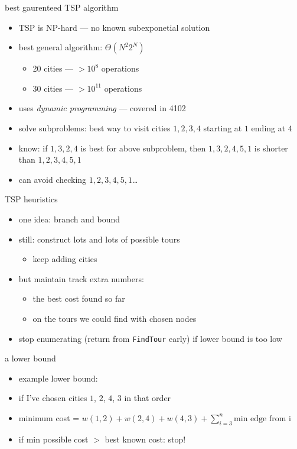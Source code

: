 \begin{frame}{best gaurenteed TSP algorithm}
\begin{itemize}
\item TSP is NP-hard --- no known subexponetial solution
\item best general algorithm: $\Theta(N^2 2^N)$
    \begin{itemize}
    \item 20 cities --- $>10^8$ operations
    \item 30 cities --- $>10^{11}$ operations
    \end{itemize}
\item uses \textit{dynamic programming} --- covered in 4102
\vspace{.5cm}
\item<2-> solve subproblems: best way to visit cities ${1,2,3,4}$ starting at $1$ ending at $4$
\item<2-> know: if $1,3,2,4$ is best for above subproblem, then $1,3,2,4,5,1$ is shorter than $1,2,3,4,5,1$
\item<2-> can avoid checking $1,2,3,4,5,1$\ldots
\end{itemize}
\end{frame}

\begin{frame}{TSP heuristics}
\begin{itemize}
\item one idea: branch and bound
\item still: construct lots and lots of possible tours
    \begin{itemize}
    \item keep adding cities
    \end{itemize}
\item but maintain track extra numbers:
    \begin{itemize}
    \item the best cost found so far
    \item {} on the tours we could find with chosen nodes
    \end{itemize}
\item stop enumerating (return from \texttt{FindTour} early) if lower bound is too low
\end{itemize}
\end{frame}

\begin{frame}{a lower bound}
\begin{itemize}
\item example lower bound:
\vspace{.5cm}
\item if I've chosen cities $1$, $2$, $4$, $3$ in that order
\item minimum cost = $w(1,2)+w(2,4)+w(4,3)+\sum_{i=3}^n\text{min edge from i}$
\item if min possible cost $>$ best known cost: stop!
\end{itemize}
\end{frame}

